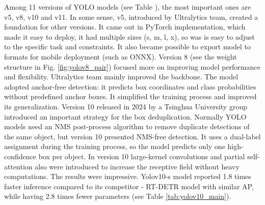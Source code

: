 \documentclass[12pt,a4paper]{report}
\begin{document}
    Among 11 versions of YOLO models (see Table \cite{khanam2024yolov11}),
    the most important ones are v5, v8, v10 and v11.
    In some sense, v5, introduced by Ultralytics team, created a foundation
    for other versions. It came out in PyTorch implementation, which made it easy
    to deploy, it had multiple sizes (s, m, l, x), so was is easy
    to adjust to the specific task and constraints. It also became possible to
    export model to formats for mobile deployment (such as ONNX).
    Version 8 (see the weight structure in Fig. \ref{fig:yolov8_pair}) focused
    more on improving model performance and flexibility.
    Ultralytics team mainly improved the backbone. The model adopted anchor-free
    detection:
    it predicts box coordinates and class probabilities without predefined
    anchor boxes. It simplified the training process and improved
    its generalization. Version 10 released in 2024 by a Tsinghua University group
    introduced an important strategy for the box deduplication. Normally YOLO
    models need an NMS post-process algorithm to remove duplicate detections
    of the same object, but version 10 presented NMS-free detection. It uses a
    dual-label assignment during the training process, so the model predicts only
    one high-confidence box per object. In version 10 large-kernel convolutions and
    partial self-attention also were introduced to increase the receptive field
    without heavy computations. The results were impressive. Yolov10-s model reported
    1.8 times faster inference compared to its competitor - RT-DETR model with similar AP,
    while having 2.8 times fewer parameters (see Table \ref{tab:yolov10_main}).
\end{document}
